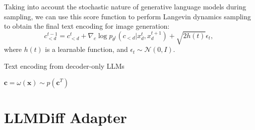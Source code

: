 Taking into account the stochastic nature of generative language models during sampling, we can use this score function to perform Langevin dynamics sampling to obtain the final text encoding for image generation:
\begin{equation}
c^{t-1}_{<d} = c^{t}_{<d} + \nabla_c \log p_{\theta^t}(c_{<d}|x^t_{d}, x^{t+1}_d) + \sqrt{2h(t)} \epsilon_t,
\end{equation}
where $h(t)$ is a learnable function, and $\epsilon_t \sim \mathcal{N}(0, I)$.

\begin{algorithm}[!t]
    \SetAlgoLined
    \newcommand\mycommfont[1]{\footnotesize\ttfamily\textcolor[rgb]{0.3608,0.5255,0.4235}{#1}}
    \caption{Text encoding from decoder-only LLMs}
    \label{algo_DCM}
    
    $\bm c = \omega(\bm x) \sim p(\bm c^T)$ 

\end{algorithm}



\section{LLMDiff Adapter}

